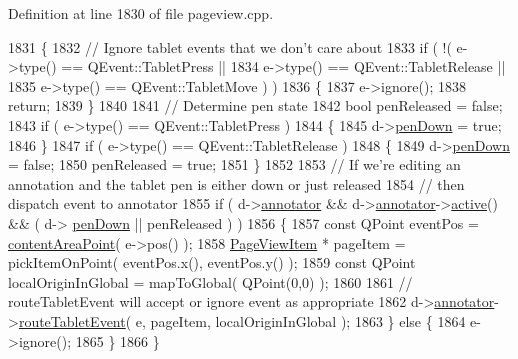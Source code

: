 Definition at line 1830 of file pageview.\+cpp.


\begin{DoxyCode}
1831 \{
1832     \textcolor{comment}{// Ignore tablet events that we don't care about}
1833     \textcolor{keywordflow}{if} ( !( e->type() == QEvent::TabletPress ||
1834             e->type() == QEvent::TabletRelease ||
1835             e->type() == QEvent::TabletMove ) )
1836     \{
1837         e->ignore();
1838         \textcolor{keywordflow}{return};
1839     \}
1840 
1841     \textcolor{comment}{// Determine pen state}
1842     \textcolor{keywordtype}{bool} penReleased = \textcolor{keyword}{false};
1843     \textcolor{keywordflow}{if} ( e->type() == QEvent::TabletPress )
1844     \{
1845         d->\hyperlink{classPageViewPrivate_ae7a7857d6dac44fa07cb314a6f239df1}{penDown} = \textcolor{keyword}{true};
1846     \}
1847     \textcolor{keywordflow}{if} ( e->type() == QEvent::TabletRelease )
1848     \{
1849         d->\hyperlink{classPageViewPrivate_ae7a7857d6dac44fa07cb314a6f239df1}{penDown} = \textcolor{keyword}{false};
1850         penReleased = \textcolor{keyword}{true};
1851     \}
1852 
1853     \textcolor{comment}{// If we're editing an annotation and the tablet pen is either down or just released}
1854     \textcolor{comment}{// then dispatch event to annotator}
1855     \textcolor{keywordflow}{if} ( d->\hyperlink{classPageViewPrivate_a07bad73b61f6b400411aacc7e2e820a0}{annotator} && d->\hyperlink{classPageViewPrivate_a07bad73b61f6b400411aacc7e2e820a0}{annotator}->\hyperlink{classPageViewAnnotator_ae7fcfee911a4eb7811865863d852ffac}{active}() && ( d->
      \hyperlink{classPageViewPrivate_ae7a7857d6dac44fa07cb314a6f239df1}{penDown} || penReleased ) )
1856     \{
1857         \textcolor{keyword}{const} QPoint eventPos = \hyperlink{classPageView_a7f432d3d6d05c69b568ad66a9c232cd7}{contentAreaPoint}( e->pos() );
1858         \hyperlink{classPageViewItem}{PageViewItem} * pageItem = pickItemOnPoint( eventPos.x(), eventPos.y() );
1859         \textcolor{keyword}{const} QPoint localOriginInGlobal = mapToGlobal( QPoint(0,0) );
1860 
1861         \textcolor{comment}{// routeTabletEvent will accept or ignore event as appropriate}
1862         d->\hyperlink{classPageViewPrivate_a07bad73b61f6b400411aacc7e2e820a0}{annotator}->\hyperlink{classPageViewAnnotator_a5b8f1d3ac283209cd76838b199adee5d}{routeTabletEvent}( e, pageItem, localOriginInGlobal );
1863     \} \textcolor{keywordflow}{else} \{
1864         e->ignore();
1865     \}
1866 \}
\end{DoxyCode}
